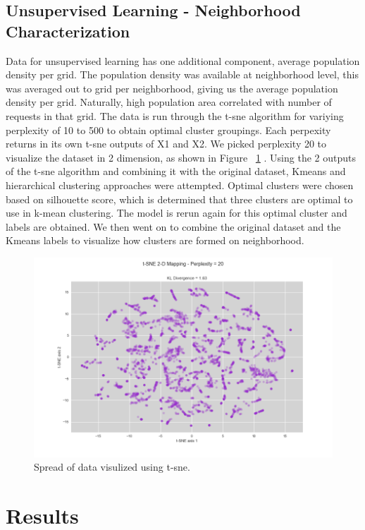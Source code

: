 \documentclass{llncs}
\begin{document}
\subsection{Unsupervised Learning - Neighborhood Characterization}
Data for unsupervised learning has one additional component, average population density per grid. The population density was available at neighborhood level, this was averaged out to grid per neighborhood, giving us the average population density per grid. Naturally, high population area correlated with number of requests in that grid. The data is run through the t-sne algorithm for variying perplexity of 10 to 500 to obtain optimal cluster groupings. Each perpexity returns in its own t-sne outputs of X1 and X2. We picked perplexity 20 to visualize the dataset in 2 dimension, as shown in Figure ~\ref{figure:perplexity} . Using the 2 outputs of the t-sne algorithm and combining it with the original dataset, Kmeans and hierarchical clustering approaches were attempted. Optimal clusters were chosen based on silhouette score, which is determined that three clusters are optimal to use in k-mean clustering. The model is rerun again for this optimal cluster and labels are obtained. We then went on to combine the original dataset and the Kmeans labels to visualize how clusters are formed on neighborhood.

\FloatBarrier
\begin{figure}
 	\includegraphics[width=\textwidth, height=\textheight, keepaspectratio]{perplexity.png}
 	\caption{Spread of data visulized using t-sne.}
	\label{figure:perplexity}

\end{figure}
\FloatBarrier
%
\section{Results}
%
\end{document}
